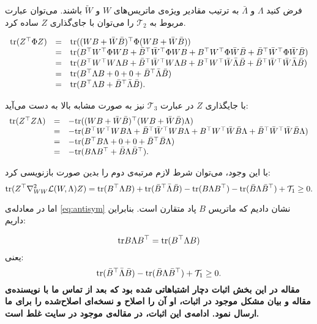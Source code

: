 فرض کنید 
$\Lambda$
و
$\bar{\Lambda}$
به ترتیب مقادیر ویژه‌ی ماتریس‌های
$W$
و 
$\tilde{W}$
باشند. می‌توان عبارت مربوط به 
$\mathcal{T}_2$
را می‌توان با جای‌گذاری 
$Z$
ساده کرد. 

\[ \begin{array}{lll}
\mathrm{tr} ( Z^\top  \Phi Z) & = & \mathrm{tr} ( ( W B + \bar{W} \bar{B})^\top  \Phi
( W B + \bar{W} \bar{B}))\\
& = & \mathrm{tr} (  B^\top  W^\top  \Phi W B + \bar{B}^\top  \bar{W}^\top  \Phi
W B + B^\top  W^\top  \Phi \bar{W} \bar{B} + \bar{B}^\top  \bar{W}^\top  \Phi \bar{W}
\bar{B})\\
& = & \mathrm{tr} (  B^\top  W^\top  W \Lambda B + \bar{B}^\top  \bar{W}^\top  W
\Lambda B + B^\top  W^\top  \bar{W} \bar{\Lambda} \bar{B} + \bar{B}^\top  \bar{W}^\top 
\bar{W} \bar{\Lambda} \bar{B}) \\
& = & \mathrm{tr} (  B^\top  \Lambda B + 0 + 0 + \bar{B}^\top 
\bar{\Lambda} \bar{B}) \\
& = & \mathrm{tr} (  B^\top  \Lambda B + \bar{B}^\top  \bar{\Lambda}
\bar{B}) .
\end{array} \]

با جایگذاری
$Z$
در عبارت
$\mathcal{T}_3$
نیز به صورت مشابه بالا به دست می‌آید:
\[ \begin{array}{lll}
\mathrm{tr} ( Z^\top  Z \Lambda) & = & - \mathrm{tr} ( ( W B + \bar{W}
\bar{B})^\top  ( W B + \bar{W} \bar{B}) \Lambda)\\
& = & - \mathrm{tr} ( B^\top  W^\top  W B \Lambda + \bar{B}^\top  \bar{W}^\top  W B
\Lambda + B^\top  W^\top  \bar{W} \bar{B} \Lambda + \bar{B}^\top  \bar{W}^\top  \bar{W}
\bar{B} \Lambda)\\
& = & - \mathrm{tr} ( B^\top  B \Lambda + 0 + 0 + \bar{B}^\top  \bar{B} \Lambda)\\
& = & - \mathrm{tr} ( B \Lambda B^\top  + \bar{B} \Lambda \bar{B}^\top ) .
\end{array} \]


با این وجود، می‌توان شرط لازم مرتبه‌ی دوم را بدین صورت بازنویسی کرد:
\begin{equation}
\mathrm{tr}(Z^\top \nabla^2_{WW} \mathcal{L} (W, \Lambda)Z) = 
\mathrm{tr} ( B^\top  \Lambda B) + \mathrm{tr} (  \bar{B}^\top  \bar{\Lambda} \bar{B}) -
\mathrm{tr} ( B \Lambda B^\top ) - \mathrm{tr} ( \bar{B} \Lambda \bar{B}^\top )
+\mathcal{T}_1 \geq 0.
\label{eq:inequality_2}
\end{equation}


اما در معادله‌ی 
\eqref{eq:antisym}
نشان دادیم که ماتریس 
$B$
پاد متقارن است. بنابراین داریم:

$$\mathrm{tr}{B\Lambda B^\top} = \mathrm{tr}(B^\top \Lambda B)$$
یعنی:
\begin{equation}
 \mathrm{tr} ( 
\bar{B}^\top  \bar{\Lambda} \bar{B}) - \mathrm{tr} ( \bar{B} \Lambda \bar{B}^\top )
+\mathcal{T}_1 \geq 0.
\end{equation}
\textbf
{مقاله در این بخش اثبات دچار اشتباهاتی شده‌ بود که بعد از تماس ما با نویسنده‌ی مقاله و بیان مشکل موجود در اثبات،  او آن را اصلاح و نسخه‌ای اصلاح‌شده را برای ما ارسال نمود. ادامه‌ی این اثبات، در مقاله‌ی موجود در سایت 
غلط است.}


